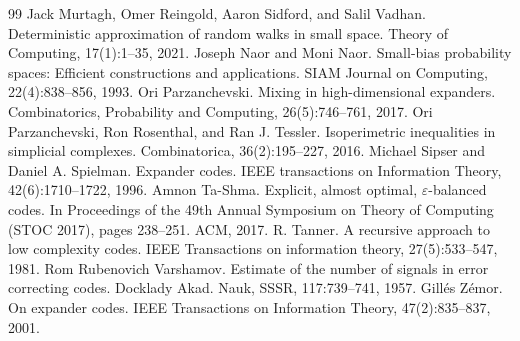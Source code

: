\begin{thebibliography}{99}
 Jack Murtagh, Omer Reingold, Aaron Sidford, and Salil Vadhan. Deterministic approximation of random walks in small space. Theory of Computing, 17(1):1–35, 2021.
 Joseph Naor and Moni Naor. Small-bias probability spaces: Efficient constructions and applications. SIAM Journal on Computing, 22(4):838–856, 1993.
 Ori Parzanchevski. Mixing in high-dimensional expanders. Combinatorics, Probability and Computing, 26(5):746–761, 2017.
 Ori Parzanchevski, Ron Rosenthal, and Ran J. Tessler. Isoperimetric inequalities in simplicial complexes. Combinatorica, 36(2):195–227, 2016.
 Michael Sipser and Daniel A. Spielman. Expander codes. IEEE transactions on Information Theory, 42(6):1710–1722, 1996.
 Amnon Ta-Shma. Explicit, almost optimal, \(\varepsilon\)-balanced codes. In Proceedings of the 49th Annual Symposium on Theory of Computing (STOC 2017), pages 238–251. ACM, 2017.
 R. Tanner. A recursive approach to low complexity codes. IEEE Transactions on information theory, 27(5):533–547, 1981.
 Rom Rubenovich Varshamov. Estimate of the number of signals in error correcting codes. Docklady Akad. Nauk, SSSR, 117:739–741, 1957.
 Gillés Zémor. On expander codes. IEEE Transactions on Information Theory, 47(2):835–837, 2001.
\end{thebibliography}
